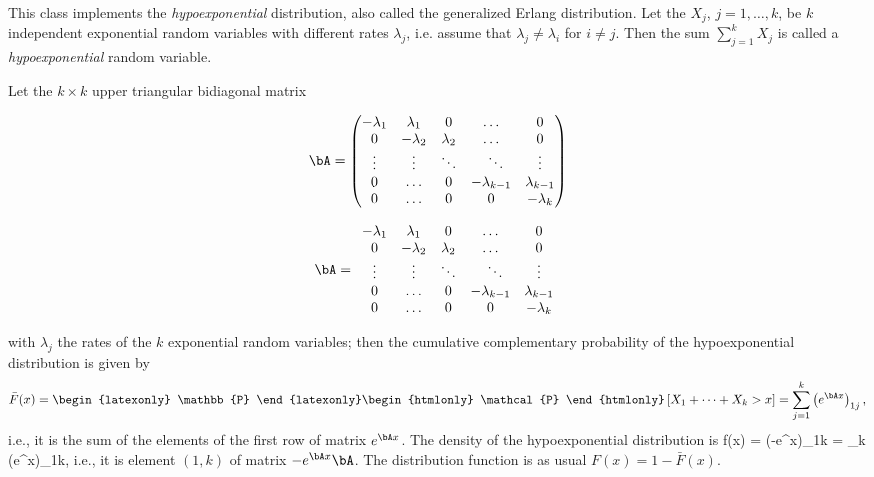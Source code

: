 
This class implements the \emph{hypoexponential} distribution,
also called the generalized Erlang  distribution. Let the $X_j$,
$j=1,\ldots,k$, be $k$ independent exponential random variables with different
rates $\lambda_j$, i.e. assume that $\lambda_j \neq \lambda_i$ for
$i \neq j$. Then the sum $\sum_{j=1}^kX_j$ is called a \emph{hypoexponential}
random variable.

Let the  $k\times k$ upper triangular bidiagonal matrix
%
\begin{latexonly}%
\begin{equation}
\label{eq:tail-hypomatrix}
  \bA = \begin{pmatrix}
   -\lambda_1 & \lambda_1 & 0 & \ldots & 0 \\
   0 & -\lambda_2& \lambda_2 & \ldots &  0 \\
   \vdots &  \vdots & \ddots & ~~\ddots & \vdots   \\
   0 & \ldots  & 0 &  -\lambda_{k-1} & \lambda_{k-1} \\
   0 & \ldots  & 0 &   0 & -\lambda_k
  \end{pmatrix}
\end{equation}
\end{latexonly}%
%
\begin{htmlonly}%
\begin{equation}
\label{eq:tail-hypomatrix}
  \bA = \begin{array}{ccccc}
   -\lambda_1 & \lambda_1 & 0 & \ldots & 0 \\
   0 & -\lambda_2& \lambda_2 & \ldots &  0 \\
   \vdots &  \vdots & \ddots & ~~\ddots & \vdots   \\
   0 & \ldots  & 0 &  -\lambda_{k-1} & \lambda_{k-1} \\
   0 & \ldots  & 0 &   0 & -\lambda_k
  \end{array}
\end{equation}
\end{htmlonly}%
%
with  $\lambda_j$ the rates of the $k$ exponential random variables;
then the cumulative complementary probability of the hypoexponential
distribution is given by \cite{pNEU81a,pLAT99a}
\begin{equation}
\label{eq:tail-hypoexp}
\bar F(x) =
\begin{latexonly} \mathbb{P}
\end{latexonly}
\begin{htmlonly} \mathcal{P}
\end{htmlonly}
\left[X_1 + \cdots + X_k > x \right] =
\sum_{j=1}^k \left(e^{\bA x}\right)_{1j},
\end{equation}
%
i.e., it is the sum of the elements of the first row of matrix $e^{\bA x}$.
The density of the hypoexponential distribution is
\eq  f(x) = \left(-e^{\bA x}\bA\right)_{1k} =
      \lambda_k  \left(e^{\bA x}\right)_{1k},
\endeq
%
i.e., it is element $(1,k)$ of matrix $-e^{\bA x}\bA$.
The distribution function is as usual $F(x) = 1 - \bar F(x)$.

